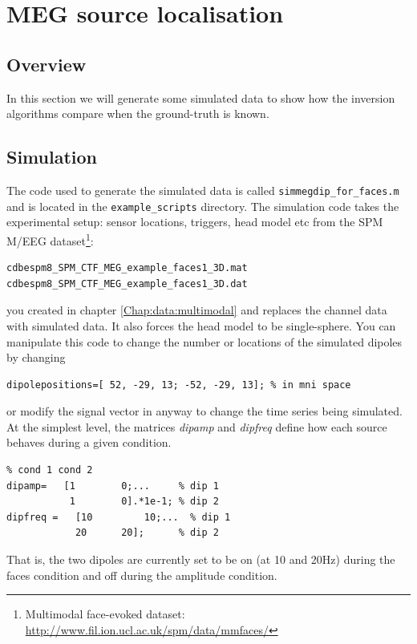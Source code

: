 \chapter{MEG source localisation\label{Chap:data:sloc}}

\section{Overview}
In this section we will generate some simulated data to show how the inversion algorithms compare when the ground-truth is known. 

\section{Simulation}
The code used to generate the simulated data is called \texttt{simmegdip\_for\_faces.m} and is located in the \texttt{example\_scripts} directory. The simulation code takes the experimental setup: sensor locations, triggers, head model etc from the SPM M/EEG dataset\footnote{Multimodal face-evoked dataset: \url{http://www.fil.ion.ucl.ac.uk/spm/data/mmfaces/}}:

\begin{verbatim}
cdbespm8_SPM_CTF_MEG_example_faces1_3D.mat
cdbespm8_SPM_CTF_MEG_example_faces1_3D.dat
\end{verbatim}

you created in chapter \ref{Chap:data:multimodal} and replaces the channel data with simulated data. It also forces the head model to be single-sphere.
You can manipulate this code to change the number or locations of the simulated dipoles by changing

\begin{verbatim}
dipolepositions=[ 52, -29, 13; -52, -29, 13]; % in mni space
\end{verbatim}
or modify the signal vector in anyway to change the time series being simulated. At the simplest level, the matrices \textit{dipamp} and \textit{dipfreq} define how each source behaves during a given condition. 

\begin{verbatim}
% cond 1 cond 2
dipamp=	  [1 		0;...     % dip 1
           1 		0].*1e-1; % dip 2 
dipfreq =	[10 		10;... 	% dip 1
         	20 		20];      % dip 2
\end{verbatim}

That is, the two dipoles are currently set to be on (at 10 and 20Hz) during the faces condition and off during the amplitude condition.

